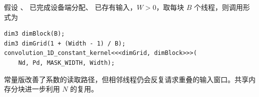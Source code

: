 假设 \mbox{}、\mbox{} 已完成设备端分配、\mbox{} 已存有输入，$W>0$，取每块 $B$ 个线程，则调用形式为
\par\noindent\begin{minipage}{\linewidth}
\begin{lstlisting}[caption={与常量版核函数匹配的启动参数。}]
dim3 dimBlock(B);
dim3 dimGrid(1 + (Width - 1) / B);
convolution_1D_constant_kernel<<<dimGrid, dimBlock>>>(
    Nd, Pd, MASK_WIDTH, Width);
\end{lstlisting}
\end{minipage}\par
常量版改善了系数的读取路径，但相邻线程仍会反复请求重叠的输入窗口。共享内存分块进一步利用 $N$ 的复用。
\FloatBarrier
